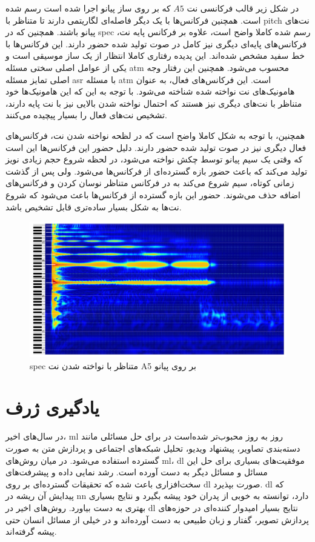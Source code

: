 در شکل زیر قالب فرکانسی نت $A5$ که بر روی ساز پیانو اجرا شده است رسم شده است.
همچنین فرکانس‌ها با یک دیگر فاصله‌ای لگاریتمی دارند تا متناظر با \gls{pitch}
نت‌های پیانو باشند. همچنین که در \gls{spec} رسم شده کاملا واضح است، علاوه بر
فرکانس پایه نت، فرکانس‌های پایه‌ای دیگری نیز کامل در صوت تولید شده حضور دارند.
این فرکانس‌ها با خط سفید مشخص شده‌اند. این پدیده رفتاری کاملا انتظار از یک ساز
موسیقی است و یکی از عوامل اصلی سختی مسئله \gls{atm} محسوب می‌شود. همچنین این
رفتار وجه اصلی تمایز مسئله \gls{asr} با مسئله \gls{atm} است. این فرکانس‌‌های
فعال، به عنوان هامونیک‌های نت نواخته شده شناخته می‌شود. با توجه به این که این
هامونیک‌ها خود متناظر با نت‌های دیگری نیز هستند که احتمال نواخته شدن بالایی نیز
با نت پایه دارند، تشخیص نت‌های فعال را بسیار پیچیده می‌کنند.

همچنین، با توجه به شکل کاملا واضح است که در لظحه نواخته شدن نت، فرکانس‌های فعال
دیگری نیز در صوت تولید شده حضور دارند. دلیل حضور این فرکانس‌ها این است که وقتی
یک سیم پیانو توسط چکش نواخته می‌شود، در لحظه شروع حجم زیادی نویز تولید می‌کند که
باعث حضور بازه گسترده‌ای از فرکانس‌ها می‌شود. ولی پس از گذشت زمانی کوتاه، سیم
شروع می‌کند به در فرکانس متناظر نوسان کردن و فرکانس‌های اضافه حذف می‌شوند. حضور
این بازه گسترده از فرکانس‌ها باعث می‌شود که شروع نت‌ها به شکل بسیار ساده‌تری
قابل تشخیص باشد.
\begin{figure}[ht]
    \centering
    \includegraphics[width=15cm]{./statics/a5_spec.png}
    \caption{\gls{spec} متناظر با نواخته شدن نت A5 بر روی پیانو}
\end{figure}

\section{یادگیری ژرف}
در سال‌های اخیر، \gls{ml} روز به روز محبوب‌تر شده‌است در برای حل مسائلی مانند
دسته‌بندی تصاویر، پیشنهاد ویدیو، تحلیل شبکه‌های اجتماعی و پردازش متن به صورت
گسترده استفاده می‌شود. در میان روش‌های \gls{ml}، \gls{dl} موفقیت‌های بسیاری برای
حل این مسائل و مسائل دیگر به دست آورده است. رشد نمایی داده و پیشرفت‌های
سخت‌افزاری باعث شده که تحقیقات گسترده‌ای بر روی \gls{dl} صورت بپذیرد. \gls{dl}
که پیدایش آن ریشه در \gls{nn} دارد، توانسته به خوبی از پدران خود پیشه بگیرد و
نتایج بسیاری بهتری به دست بیاورد. روش‌های اخیر در \gls{dl} نتایج بسیار امیدوار
کننده‌ای در حوزه‌های پردازش تصویر، گفتار و زبان طبیعی به دست آورده‌اند و در خیلی
از مسائل انسان حتی پیشه گرفته‌اند.

